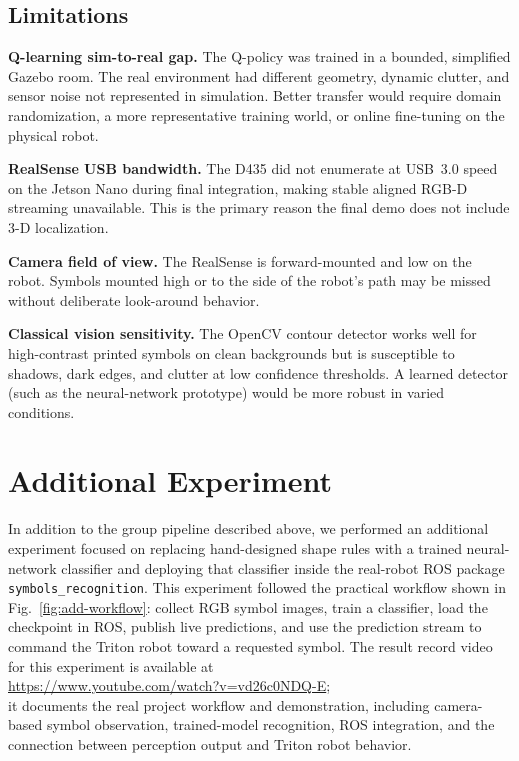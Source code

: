 \documentclass[letterpaper, 10 pt, conference]{ieeeconf/ieeeconf}
\begin{document}
\subsection{Limitations}

\textbf{Q-learning sim-to-real gap.}
The Q-policy was trained in a bounded, simplified Gazebo room.
The real environment had different geometry, dynamic clutter, and sensor
noise not represented in simulation.
Better transfer would require domain randomization, a more representative
training world, or online fine-tuning on the physical robot.

\textbf{RealSense USB bandwidth.}
The D435 did not enumerate at USB~3.0 speed on the Jetson Nano during final
integration, making stable aligned RGB-D streaming unavailable.
This is the primary reason the final demo does not include 3-D localization.

\textbf{Camera field of view.}
The RealSense is forward-mounted and low on the robot.
Symbols mounted high or to the side of the robot's path may be missed without
deliberate look-around behavior.

\textbf{Classical vision sensitivity.}
The OpenCV contour detector works well for high-contrast printed symbols
on clean backgrounds but is susceptible to shadows, dark edges, and clutter
at low confidence thresholds.
A learned detector (such as the neural-network prototype) would be more
robust in varied conditions.

\section{Additional Experiment}
\label{sec:additional-experiment}

In addition to the group pipeline described above, we performed an additional
experiment focused on replacing hand-designed shape rules with a trained
neural-network classifier and deploying that classifier inside the real-robot
ROS package \texttt{symbols\_recognition}.
This experiment followed the practical workflow shown in
Fig.~\ref{fig:add-workflow}: collect RGB symbol images, train a classifier,
load the checkpoint in ROS, publish live predictions, and use the prediction
stream to command the Triton robot toward a requested symbol. The result record video for this experiment is available at
\\ \url{https://www.youtube.com/watch?v=vd26c0NDQ-E}; \\ it documents the real
project workflow and demonstration, including camera-based symbol observation,
trained-model recognition, ROS integration, and the connection between
perception output and Triton robot behavior.
\end{document}

